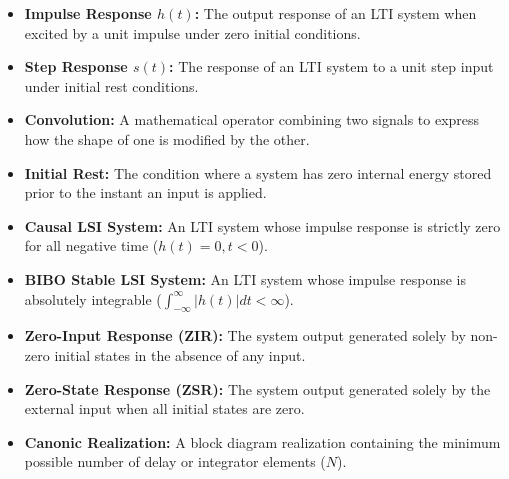 \documentclass[12pt,a4paper]{article}
\begin{document}
\begin{tcolorbox}[defbox, title={\textbf{One-Line Definitions}}]
\begin{itemize}[leftmargin=*, itemsep=2pt, topsep=0pt]
  \item \textbf{Impulse Response $h(t)$:} The output response of an LTI system when excited by a unit impulse under zero initial conditions.
  \item \textbf{Step Response $s(t)$:} The response of an LTI system to a unit step input under initial rest conditions.
  \item \textbf{Convolution:} A mathematical operator combining two signals to express how the shape of one is modified by the other.
  \item \textbf{Initial Rest:} The condition where a system has zero internal energy stored prior to the instant an input is applied.
  \item \textbf{Causal LSI System:} An LTI system whose impulse response is strictly zero for all negative time ($h(t) = 0, t < 0$).
  \item \textbf{BIBO Stable LSI System:} An LTI system whose impulse response is absolutely integrable ($\int_{-\infty}^\infty |h(t)|dt < \infty$).
  \item \textbf{Zero-Input Response (ZIR):} The system output generated solely by non-zero initial states in the absence of any input.
  \item \textbf{Zero-State Response (ZSR):} The system output generated solely by the external input when all initial states are zero.
  \item \textbf{Canonic Realization:} A block diagram realization containing the minimum possible number of delay or integrator elements ($N$).
\end{itemize}
\end{tcolorbox}
\end{document}
